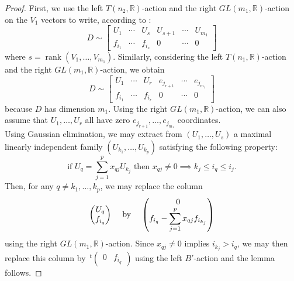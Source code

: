 \documentclass[pdftex]{sigma}
\numberwithin{equation}{section}
\theoremstyle{definition}
\newcommand{\rank}{\operatorname{rank}}
\newcommand{\R}{\mathbb{R}}
\newcommand{\T}{T}
\theoremstyle{plain}
\theoremstyle{plain}
\theoremstyle{plain}
\theoremstyle{plain}
\begin{document}
\begin{proof}
	First, we use the left $\T(n_2,\R)$-action and the right $GL(m_1,\R)$-action on the $V_1$ vectors to write, according to :
	\begin{equation*}
		D \sim \begin{bmatrix}
		U_{1} & \cdots & U_{s} & U_{s+1} & \cdots & U_{m_1} \\
		f_{i_1} & \cdots & f_{i_s} & 0 & \cdots & 0
	\end{bmatrix}
	\end{equation*}
	where $s = \rank(V_1,\dots,V_{m_1})$. Similarly, considering the left $\T(n_1,\R)$-action and the right $GL(m_1,\R)$-action, we obtain
	\begin{equation*}
		D \sim \begin{bmatrix}
		U_{1} & \cdots & U_{r} & e_{j_{r+1}} & \cdots & e_{j_{m_1}} \\
		f_{i_1} & \cdots & f_{i_r} & 0 & \cdots & 0
	\end{bmatrix}
	\end{equation*}
	because $D$ has dimension $m_1$. Using the right $GL(m_1,\R)$-action, we can also assume that $U_1,\dots,U_r$ all have zero $e_{j_{r+1}},\dots,e_{j_{m_1}}$ coordinates.\\
	Using Gaussian elimination, we may extract from $(U_1,\dots,U_s)$ a maximal linearly independent family $(U_{k_1},\dots,U_{k_p})$  satisfying the following property:
	\begin{equation*}
		\text{if } U_q = \sum_{j=1}^p x_{qj}U_{k_j} \text{ then } x_{qj} \neq 0 \implies k_{j} \leqslant i_q \leqslant i_j.
	\end{equation*}
	Then, for any $q \neq k_1,\dots,k_p$, we may replace the column
	\begin{equation*}
		\begin{pmatrix}
		U_q \\
		f_{i_q}
	\end{pmatrix} \hspace{3mm} \text{ by } \hspace{3mm} 
		\begin{pmatrix}
		0 \\
		f_{i_q} - \displaystyle\sum_{j=1}^p x_{qj}f_{i_{k_j}}
	\end{pmatrix}
	\end{equation*}
	using the right $GL(m_1,\R)$-action.
	Since $x_{qj} \neq 0$ implies $i_{k_j} > i_q$, we may then replace this column by $\,^t\begin{pmatrix}
		0 & f_{i_q}
	\end{pmatrix}$ using the left $B'$-action and the lemma follows.
\end{proof}
\end{document}
